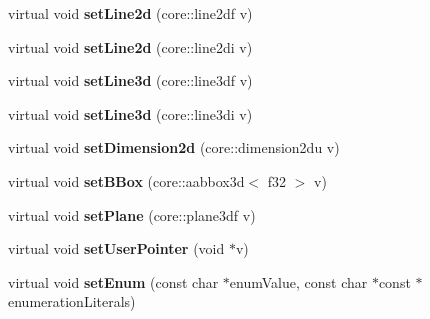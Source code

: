 \begin{DoxyCompactItemize}
\item 
\hypertarget{classirr_1_1io_1_1_i_attribute_af1af001e216d3be652edc98d5c19122a}{virtual void {\bfseries set\-Line2d} (core\-::line2df v)}\label{classirr_1_1io_1_1_i_attribute_af1af001e216d3be652edc98d5c19122a}

\item 
\hypertarget{classirr_1_1io_1_1_i_attribute_a4c30d60e1ba1000d0096926d2e6f9089}{virtual void {\bfseries set\-Line2d} (core\-::line2di v)}\label{classirr_1_1io_1_1_i_attribute_a4c30d60e1ba1000d0096926d2e6f9089}

\item 
\hypertarget{classirr_1_1io_1_1_i_attribute_a0a722ff34d14bfe8b3f1d3e9b6aa3d4a}{virtual void {\bfseries set\-Line3d} (core\-::line3df v)}\label{classirr_1_1io_1_1_i_attribute_a0a722ff34d14bfe8b3f1d3e9b6aa3d4a}

\item 
\hypertarget{classirr_1_1io_1_1_i_attribute_aaa5b9ed3658f36ecf744d103d9cb5f90}{virtual void {\bfseries set\-Line3d} (core\-::line3di v)}\label{classirr_1_1io_1_1_i_attribute_aaa5b9ed3658f36ecf744d103d9cb5f90}

\item 
\hypertarget{classirr_1_1io_1_1_i_attribute_ac19ad704ddffc2bdad7e1b86e752139f}{virtual void {\bfseries set\-Dimension2d} (core\-::dimension2du v)}\label{classirr_1_1io_1_1_i_attribute_ac19ad704ddffc2bdad7e1b86e752139f}

\item 
\hypertarget{classirr_1_1io_1_1_i_attribute_a83e002dcdcb102100ca152c858492f4d}{virtual void {\bfseries set\-B\-Box} (core\-::aabbox3d$<$ f32 $>$ v)}\label{classirr_1_1io_1_1_i_attribute_a83e002dcdcb102100ca152c858492f4d}

\item 
\hypertarget{classirr_1_1io_1_1_i_attribute_a1043a6260a73127fd85ed9fc36b910aa}{virtual void {\bfseries set\-Plane} (core\-::plane3df v)}\label{classirr_1_1io_1_1_i_attribute_a1043a6260a73127fd85ed9fc36b910aa}

\item 
\hypertarget{classirr_1_1io_1_1_i_attribute_a75f4347147550a30b56c2c1828ea8cc6}{virtual void {\bfseries set\-User\-Pointer} (void $\ast$v)}\label{classirr_1_1io_1_1_i_attribute_a75f4347147550a30b56c2c1828ea8cc6}

\item 
\hypertarget{classirr_1_1io_1_1_i_attribute_acd6f16de6217b6aa1a6616f887cd9b50}{virtual void {\bfseries set\-Enum} (const char $\ast$enum\-Value, const char $\ast$const $\ast$enumeration\-Literals)}\label{classirr_1_1io_1_1_i_attribute_acd6f16de6217b6aa1a6616f887cd9b50}


\end{DoxyCompactItemize}
